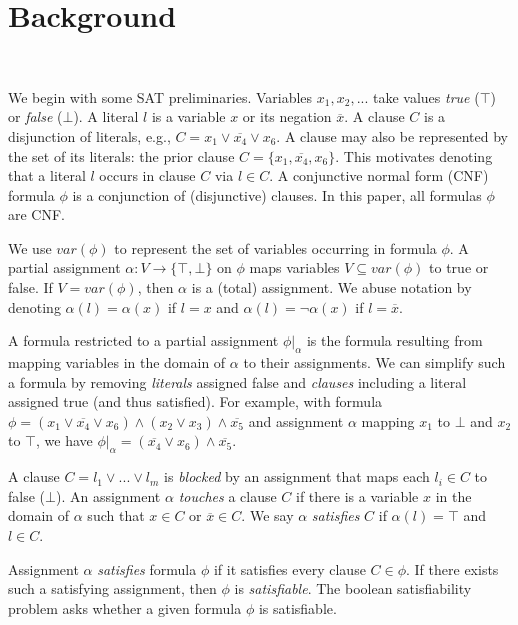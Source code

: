 \section{Background}~\label{sec:background}

We begin with some SAT preliminaries. Variables $x_1, x_2, ...$ take values
\emph{true} ($\top$) or \emph{false} ($\bot$). A literal $l$ is a variable
$x$ or its negation $\overline{x}$. A clause $C$ is a disjunction of literals,
e.g., $C = x_1 \lor \overline{x_4} \lor x_6$. A clause may also be represented by the set of its literals:
the prior clause $C = \{x_1, \overline{x_4}, x_6\}$. This motivates denoting that a literal
$l$ occurs in clause $C$ via $l \in C$. A conjunctive normal form (CNF)
formula $\phi$ is a conjunction of (disjunctive) clauses. In this paper,
all formulas $\phi$ are CNF.

We use $var(\phi)$ to represent the set of variables occurring in formula $\phi$.
A partial assignment $\alpha : V \rightarrow \{\top, \bot\}$ on $\phi$
maps variables $V \subseteq var(\phi)$ to true or false. If $V
= var(\phi)$, then $\alpha$ is a (total) assignment. We abuse notation by
denoting $\alpha(l) = \alpha(x)$ if $l = x$ and $\alpha(l) = \neg \alpha(x)$ if
$l = \overline{x}$.

A formula restricted to a partial assignment $\phi|_\alpha$ is the formula resulting from
mapping variables in the domain of $\alpha$ to their assignments. We can
simplify such a formula by removing \emph{literals} assigned false and
\emph{clauses} including a literal assigned true (and thus satisfied).
For example, with formula $\phi =
(x_1 \lor \overline{x_4} \lor x_6) \land (x_2 \lor x_3) \land \overline{x_5}$
and assignment $\alpha$ mapping $x_1$ to $\bot$ and $x_2$ to $\top$,
we have $\phi|_\alpha = (\overline{x_4} \lor x_6) \land \overline{x_5}$.

A clause $C = l_1 \lor ... \lor l_m$ is \emph{blocked} by an assignment
that maps each $l_i \in C$ to false ($\bot$). An assignment $\alpha$
\emph{touches} a clause $C$ if there is a variable $x$ in the domain of $\alpha$
such that $x \in C$ or $\overline{x} \in C$. We say $\alpha$ \emph{satisfies}
$C$ if $\alpha(l) = \top$ and $l \in C$.

Assignment $\alpha$ \emph{satisfies} formula $\phi$ if it satisfies every
clause $C \in \phi$. If there exists such a satisfying assignment, then $\phi$ is
\emph{satisfiable}. The boolean satisfiability problem asks whether a given
formula $\phi$ is satisfiable.

